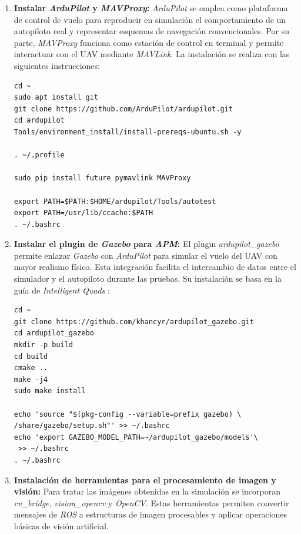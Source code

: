 \begin{enumerate}
\item \textbf{Instalar \textit{ArduPilot} y \textit{MAVProxy}:}
\textit{ArduPilot} se emplea como plataforma de control de vuelo para reproducir en simulación el comportamiento de un autopiloto real y representar esquemas de navegación convencionales. Por su parte, \textit{MAVProxy} funciona como estación de control en terminal y permite interactuar con el UAV mediante \textit{MAVLink}. La instalación se realiza con las siguientes instrucciones:

\begin{verbatim}
cd ~
sudo apt install git
git clone https://github.com/ArduPilot/ardupilot.git
cd ardupilot
Tools/environment_install/install-prereqs-ubuntu.sh -y

. ~/.profile

sudo pip install future pymavlink MAVProxy

export PATH=$PATH:$HOME/ardupilot/Tools/autotest
export PATH=/usr/lib/ccache:$PATH
. ~/.bashrc
\end{verbatim}



\item \textbf{Instalar el plugin de \textit{Gazebo} para \textit{APM}:}
El plugin \textit{ardupilot\_gazebo} permite enlazar \textit{Gazebo} con \textit{ArduPilot} para simular el vuelo del UAV con mayor realismo físico. Esta integración facilita el intercambio de datos entre el simulador y el autopiloto durante las pruebas. Su instalación se basa en la guía de \textit{Intelligent Quads} \cite{iqtutorialsgazeboapm}:

\begin{verbatim}
cd ~
git clone https://github.com/khancyr/ardupilot_gazebo.git
cd ardupilot_gazebo
mkdir -p build
cd build
cmake ..
make -j4
sudo make install

echo 'source "$(pkg-config --variable=prefix gazebo) \
/share/gazebo/setup.sh"' >> ~/.bashrc
echo 'export GAZEBO_MODEL_PATH=~/ardupilot_gazebo/models'\
 >> ~/.bashrc
. ~/.bashrc
\end{verbatim}


\item \textbf{Instalación de herramientas para el procesamiento de imagen y visión:}
Para tratar las imágenes obtenidas en la simulación se incorporan \textit{cv\_bridge}, \textit{vision\_opencv} y \textit{OpenCV}. Estas herramientas permiten convertir mensajes de \textit{ROS} a estructuras de imagen procesables y aplicar operaciones básicas de visión artificial.


\end{enumerate}
